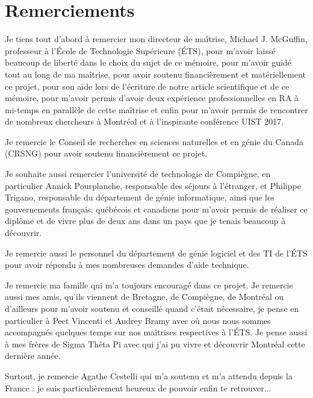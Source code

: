 {}
\chapter*{Remerciements}

Je tiens tout d'abord à remercier mon directeur de maîtrise, Michael J. McGuffin, professeur à l'École de Technologie Supérieure (ÉTS), pour m'avoir laissé beaucoup de liberté dans le choix du sujet de ce mémoire, pour m'avoir guidé tout au long de ma maîtrise, pour avoir soutenu financièrement et matériellement ce projet, pour son aide lors de l'écriture de notre article scientifique et de ce mémoire, pour m'avoir permis d'avoir deux expérience professionnelles en RA à mi-temps en parallèle de cette maîtrise et enfin pour m'avoir permis de rencontrer de nombreux chercheurs à Montréal et à l'inspirante conférence UIST 2017.

Je remercie le Conseil de recherches en sciences naturelles et en génie du Canada (CRSNG) pour avoir soutenu financièrement ce projet.

Je souhaite aussi remercier l'université de technologie de Compiègne, en particulier Annick Pourplanche, responsable des séjours à l'étranger, et Philippe Trigano, responsable du département de génie informatique, ainsi que les gouvernements français, québécois et canadiens pour m'avoir permis de réaliser ce diplôme et de vivre plus de deux ans dans un pays que je tenais beaucoup à découvrir.

Je remercie aussi le personnel du département de génie logiciel et des TI de l'ÉTS pour avoir répondu à mes nombreuses demandes d'aide technique.

Je remercie ma famille qui m'a toujours encouragé dans ce projet. Je remercie aussi mes amis, qu'ils viennent de Bretagne, de Compiègne, de Montréal ou d'ailleurs pour m'avoir soutenu et conseillé quand c'était nécessaire, je pense en particulier à Peet Vincenti et Audrey Bramy avec où nous nous sommes accompagnés quelques temps sur nos maîtrises respectives à l'ÉTS. Je pense aussi à mes frères de Sigma Thêta Pi avec qui j'ai pu vivre et découvrir Montréal cette dernière année.

Surtout, je remercie Agathe Cestelli qui m'a soutenu et m'a attendu depuis la France : je suis particulièrement heureux de pouvoir enfin te retrouver...